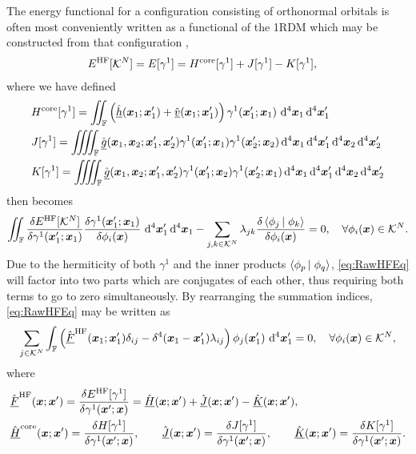 The energy functional for a configuration consisting of orthonormal orbitals is often most conveniently 
written as a functional of the 1RDM which may be constructed from that configuration \cite{Yang89_book},
\begin{align}
&E^\mathrm{HF}[\mathcal{K}^N] = E[\gamma^1] = H^{\mathrm{core}}[\gamma^1] + J[\gamma^1] - K[\gamma^1],
\end{align}
where we have defined
\begin{align}
  &H^\core[\gamma^1] = 
    \iint_\mathbb{F} \left( \spop{h}(\vc{x}_1; \vc{x}_1') + \spop{v}(\vc{x}_1; \vc{x}_1')\right) \gamma^1(\vc{x}'_1; \vc{x}_1) \, \dd^4\vc{x}_1 \dd^4\vc{x}'_1\,\,  \label{eq:CoreFunc}
    \\
  &J[\gamma^1] = \iiiint_\mathbb{F} \spop{g}(\vc{x}_1, \vc{x}_2; \vc{x}_1', \vc{x}_2') 
      \gamma^1(\vc{x}'_1; \vc{x}_1)\gamma^1(\vc{x}'_2; \vc{x}_2) 
    \dd^4\vc{x}_1 \dd^4\vc{x}'_1\dd^4\vc{x}_2 \dd^4\vc{x}'_2 \label{eq:ClassCoulFunc}\\
  &K[\gamma^1] = \iiiint_\mathbb{F} \spop{g}(\vc{x}_1, \vc{x}_2; \vc{x}_1', \vc{x}_2') 
      \gamma^1(\vc{x}'_1; \vc{x}_2)\gamma^1(\vc{x}'_2; \vc{x}_1) 
    \dd^4\vc{x}_1 \dd^4\vc{x}'_1\dd^4\vc{x}_2 \dd^4\vc{x}'_2  \label{eq:ExchFunc}
\end{align}
 then becomes
\begin{equation}
    \label{eq:RawHFEq}
    \int\mkern-12mu\int_{\mathbb F}\frac{\delta E^\mathrm{HF}[\mathcal{K}^N]}{\delta \gamma^{1} (\boldsymbol{x}'_1; \boldsymbol{x}_1)} \frac{\delta \gamma^{1}(\boldsymbol{x}'_1; \boldsymbol{x}_1)}{\delta \phi_i(\boldsymbol{x})} \,\,\mathrm{d}^4\boldsymbol{x}'_1 \,\mathrm{d}^4 \boldsymbol{x}_1 - 
    \sum_{j,k \in \mathcal{K}^N} \lambda_{jk} \frac{\delta \left\langle \phi_j \left\vert\right. \phi_k \right\rangle}{\delta \phi_i(\boldsymbol{x})}  = 0 ,\quad \forall \phi_i(\boldsymbol{x}) \in \mathcal{K}^N.
\end{equation}
Due to the hermiticity of both $\gamma^1$ and the inner products $\left\langle \phi_p \left\vert\right. \phi_q \right\rangle$, \cref{eq:RawHFEq} will factor into two parts which are 
conjugates of each other, thus requiring both terms to go to zero simultaneously. By rearranging the summation indices, \cref{eq:RawHFEq} may be written as
\begin{align}
  \label{eq:HFNonCan}
  \sum_{j \in \mathcal{K}^N}
  \int_{\mathbb F} \left( \hat{\underline{F}}^{\mathrm{HF}}(\boldsymbol{x}_1; \boldsymbol{x}_1')\delta_{ij}   - \delta^4(\boldsymbol{x} _1- \boldsymbol{x}_1')\lambda_{ij} \right)
    \phi_j(\boldsymbol{x}_1')\,\,\mathrm{d}^4\boldsymbol{x}_1' = 0 ,\quad \forall \phi_i(\boldsymbol{x}) \in \mathcal{K}^N,
\end{align}
where
\begin{align}
  \label{eq:HFFockSpace}
&\hat{\underline{F}}^{\mathrm{HF}}(\boldsymbol{x}; \boldsymbol{x}') = 
  \frac{\delta E^\mathrm{HF}[\gamma^1]}{\delta \gamma^{1}(\boldsymbol{x}'; \boldsymbol{x})} = \hat{\underline{H}}(\boldsymbol{x};\boldsymbol{x}') + \hat{\underline{J}}(\boldsymbol{x};\boldsymbol{x}') - \hat{\underline{K}}(\boldsymbol{x};\boldsymbol{x}'),\\
&\hat{\underline{H}}^{\mathrm{core}}(\boldsymbol{x}; \boldsymbol{x}') = \frac{\delta H[\gamma^1]}{\delta \gamma^1(\boldsymbol{x}'; \boldsymbol{x})},\qquad 
\hat{\underline{J}}(\boldsymbol{x}; \boldsymbol{x}') = \frac{\delta J[\gamma^1]}{\delta \gamma^1(\boldsymbol{x}'; \boldsymbol{x})}, \qquad
\hat{\underline{K}}(\boldsymbol{x}; \boldsymbol{x}') = \frac{\delta K[\gamma^1]}{\delta \gamma^1(\boldsymbol{x}'; \boldsymbol{x})} . \label{eq:FockComponents}
\end{align}
